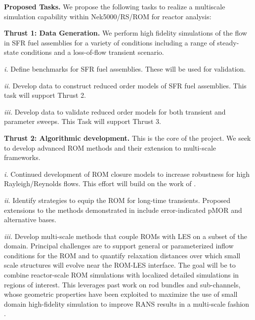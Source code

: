 \noindent

\vspace{-.1in}
{\bf Proposed Tasks.}
We propose the following tasks to realize a multiscale simulation
capability within Nek5000/RS/ROM for reactor analysis:

\textbf{Thrust 1: Data Generation.} We perform high fidelity simulations of the
flow in SFR fuel assemblies for a variety of conditions including a range of
steady-state conditions and a loss-of-flow transient scenario.
\\[-4ex]
\begin{description}
\item{\em i.}
Define benchmarks for SFR fuel assemblies. These will be used for validation.
\\[-4ex]
\item{\em ii.}
Develop data to construct reduced order models of SFR fuel assemblies. This
task will support Thrust 2.  
\\[-4ex]
\item{\em iii.} Develop data to validate reduced order models for both
transient and parameter sweeps. This Task will support Thrust 3.
\\[-4ex]
\end{description}

\textbf{Thrust 2: Algorithmic development.} This is the core of the project.
We seek to develop advanced ROM methods and their extension to multi-scale
frameworks.
\\[-5ex]
\begin{description}
\item{\em i.}
Continued development of ROM closure models to increase robustness 
for high Rayleigh/Reynolds flows.  This effort will build on the work of
\cite{kaneko22a,kaneko22,tsai22a}.
\\[-3ex]
\item{\em ii.}
Identify strategies to equip the ROM for long-time transients.  
Proposed extensions to the methods demonstrated in \cite{kaneko20a}
include error-indicated pMOR and alternative bases.
\\[-3ex]
\item{\em iii.}
Develop multi-scale methods that couple ROMs with LES on a subset of the
domain.  Principal challenges are to support general or parameterized inflow
conditions for the ROM and to quantify relaxation distances over which small
scale structures will evolve near the ROM-LES interface. The goal will be to
combine reactor-scale ROM simulations with localized detailed simulations in
regions of interest. This leverages past work on rod bundles and sub-channels,
whose geometric properties have been exploited to maximize the use of small
domain high-fidelity simulation to improve RANS results in a multi-scale
fashion \cite{martinez2019a}.  
\\[-5ex]
\end{description}%

